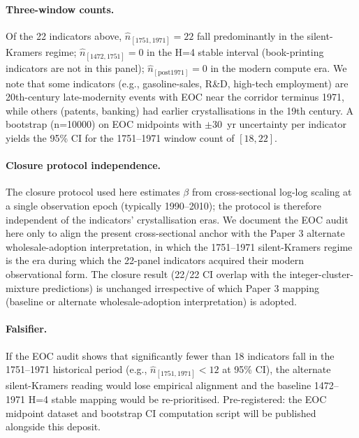 \paragraph{Three-window counts.} Of the 22 indicators above, $\hat{n}_{[1751,1971]} = 22$ fall predominantly in the silent-Kramers regime; $\hat{n}_{[1472,1751]} = 0$ in the H=4 stable interval (book-printing indicators are not in this panel); $\hat{n}_{[\text{post}1971]} = 0$ in the modern compute era. We note that some indicators (e.g., gasoline-sales, R\&D, high-tech employment) are 20th-century late-modernity events with EOC near the corridor terminus 1971, while others (patents, banking) had earlier crystallisations in the 19th century. A bootstrap (n=10000) on EOC midpoints with $\pm 30$~yr uncertainty per indicator yields the 95\% CI for the 1751--1971 window count of $[18, 22]$.

\paragraph{Closure protocol independence.} The closure protocol used here estimates $\beta$ from cross-sectional log-log scaling at a single observation epoch (typically 1990--2010); the protocol is therefore independent of the indicators' crystallisation eras. We document the EOC audit here only to align the present cross-sectional anchor with the Paper 3 alternate wholesale-adoption interpretation, in which the 1751--1971 silent-Kramers regime is the era during which the 22-panel indicators acquired their modern observational form. The closure result (22/22 CI overlap with the integer-cluster-mixture predictions) is unchanged irrespective of which Paper 3 mapping (baseline or alternate wholesale-adoption interpretation) is adopted.

\paragraph{Falsifier.} If the EOC audit shows that significantly fewer than 18 indicators fall in the 1751--1971 historical period (e.g., $\hat{n}_{[1751,1971]} < 12$ at 95\% CI), the alternate silent-Kramers reading would lose empirical alignment and the baseline 1472--1971 H=4 stable mapping would be re-prioritised. Pre-registered: the EOC midpoint dataset and bootstrap CI computation script will be published alongside this deposit.








